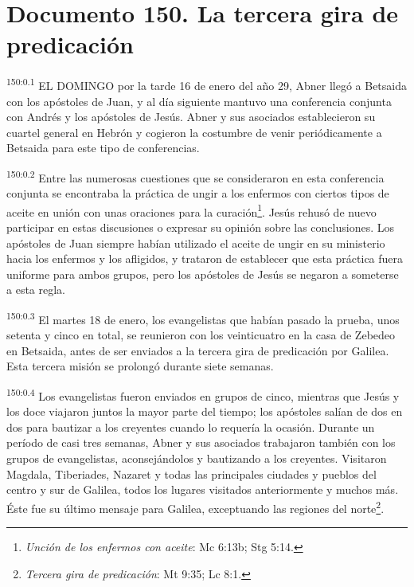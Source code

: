 \chapter{Documento 150. La tercera gira de predicación}
\par
\textsuperscript{150:0.1} EL DOMINGO por la tarde 16 de enero del año 29, Abner llegó a Betsaida con los apóstoles de Juan, y al día siguiente mantuvo una conferencia conjunta con Andrés y los apóstoles de Jesús. Abner y sus asociados establecieron su cuartel general en Hebrón y cogieron la costumbre de venir periódicamente a Betsaida para este tipo de conferencias.

\par
\textsuperscript{150:0.2} Entre las numerosas cuestiones que se consideraron en esta conferencia conjunta se encontraba la práctica de ungir a los enfermos con ciertos tipos de aceite en unión con unas oraciones para la curación\footnote{\textit{Unción de los enfermos con aceite}: Mc 6:13b; Stg 5:14.}. Jesús rehusó de nuevo participar en estas discusiones o expresar su opinión sobre las conclusiones. Los apóstoles de Juan siempre habían utilizado el aceite de ungir en su ministerio hacia los enfermos y los afligidos, y trataron de establecer que esta práctica fuera uniforme para ambos grupos, pero los apóstoles de Jesús se negaron a someterse a esta regla.

\par
\textsuperscript{150:0.3} El martes 18 de enero, los evangelistas que habían pasado la prueba, unos setenta y cinco en total, se reunieron con los veinticuatro en la casa de Zebedeo en Betsaida, antes de ser enviados a la tercera gira de predicación por Galilea. Esta tercera misión se prolongó durante siete semanas.

\par
\textsuperscript{150:0.4} Los evangelistas fueron enviados en grupos de cinco, mientras que Jesús y los doce viajaron juntos la mayor parte del tiempo; los apóstoles salían de dos en dos para bautizar a los creyentes cuando lo requería la ocasión. Durante un período de casi tres semanas, Abner y sus asociados trabajaron también con los grupos de evangelistas, aconsejándolos y bautizando a los creyentes. Visitaron Magdala, Tiberiades, Nazaret y todas las principales ciudades y pueblos del centro y sur de Galilea, todos los lugares visitados anteriormente y muchos más. Éste fue su último mensaje para Galilea, exceptuando las regiones del norte\footnote{\textit{Tercera gira de predicación}: Mt 9:35; Lc 8:1.}.

